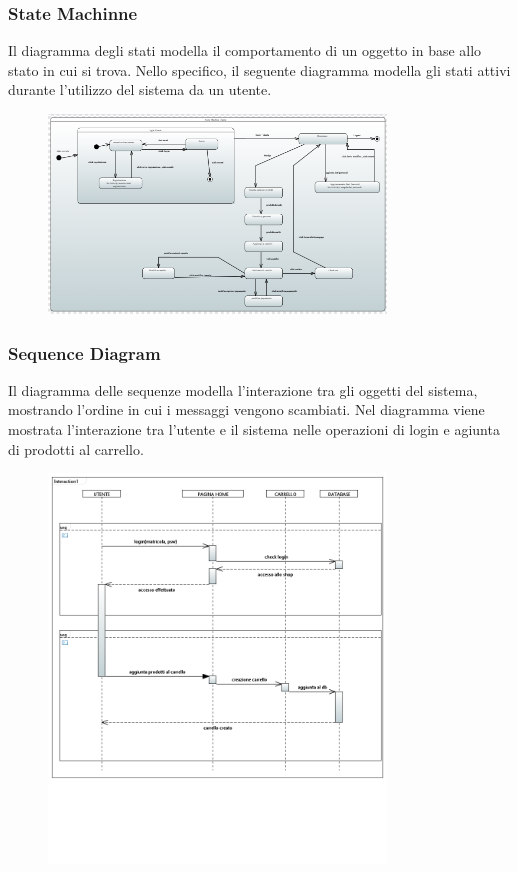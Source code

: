 \documentclass[a4paper,12pt]{article}
\begin{document}
\subsubsection{State Machinne}
Il diagramma degli stati modella il comportamento di un oggetto in base allo stato in cui si trova.
Nello specifico, il seguente diagramma modella gli stati attivi durante l'utilizzo del sistema da un utente.
\begin{figure}[H]
    \centering
    \includegraphics[width=0.8\textwidth]{../UML/UML png/StateMachine.png}
    \label{fig:State Machine}
\end{figure}
\newpage
\subsubsection{Sequence Diagram}
Il diagramma delle sequenze modella l'interazione tra gli oggetti del sistema, mostrando l'ordine in cui i messaggi vengono scambiati. Nel diagramma viene mostrata l'interazione tra l'utente e il sistema nelle operazioni di login e agiunta di prodotti al carrello.
\begin{figure}[H]
    \centering
    \includegraphics[width=0.8\textwidth]{../UML/UML png/Sequence_Diagram.png}
    \label{fig:Sequence Diagram}
\end{figure}
\newpage
\end{document}
